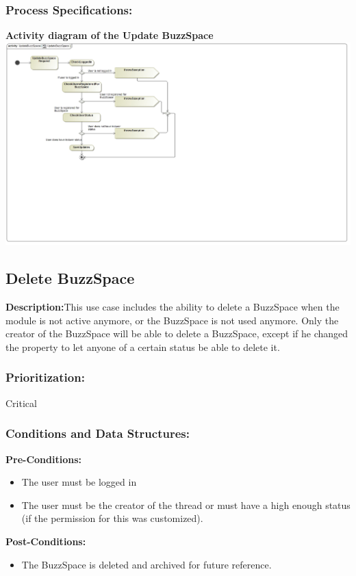 \documentclass[a4paper,11pt]{article}
\begin{document}
\subsubsection{Process Specifications:} 
\textbf{Activity diagram of the Update BuzzSpace}\\ 
\includegraphics[width=1\linewidth]{./Images/BuzzSpaceHandling/buzzSpaceUpdateAct.jpg}\\

\subsection{Delete BuzzSpace}
\textbf{Description:}This use case includes the ability to delete a BuzzSpace when the module is not active anymore, or the BuzzSpace is not used anymore. Only the creator of the 
BuzzSpace will be able to delete a BuzzSpace, except if he changed the property to let anyone of a certain status be able to delete it.
\subsubsection{Prioritization:} Critical
\subsubsection{Conditions and Data Structures:}
\textbf{Pre-Conditions:}
\begin{itemize}
	\item The user must be logged in
	\item The user must be the creator of the thread or must have a high enough status (if the permission for this was customized).
\end{itemize}
\textbf{Post-Conditions:}
\begin{itemize}
	\item The BuzzSpace is deleted and archived for future reference. 
\end{itemize}
\end{document}
